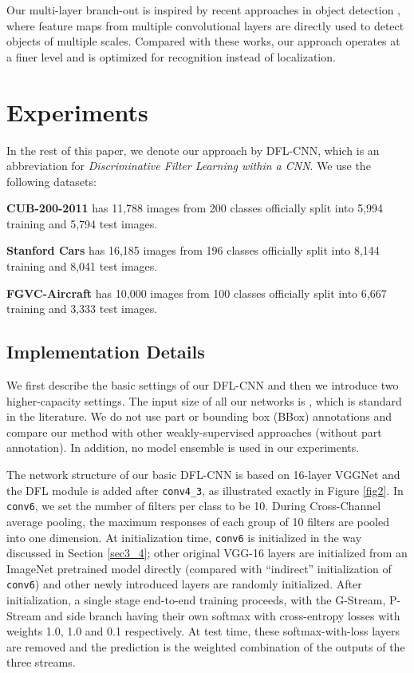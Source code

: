 \documentclass[10pt,twocolumn,letterpaper]{article}
\begin{document}
Our multi-layer branch-out is inspired by recent approaches in object detection \cite{ssd,
fanyang16}, where feature maps from multiple convolutional layers are directly used to detect objects of 
multiple scales. Compared with these works, our approach operates at a finer level
and is optimized for recognition instead of localization.

\section{Experiments} \label{sec4}
In the rest of this paper, we denote our approach by DFL-CNN, which is an abbreviation for \textit{Discriminative Filter Learning within a
CNN}. We use the following datasets: 

\noindent\textbf{CUB-200-2011} \cite{cub2011} has 11,788 images from 200 classes officially split into 5,994
training and 5,794 test images. 

\noindent\textbf{Stanford Cars} \cite{car196} has 16,185 images from 196 classes officially split into 8,144
training and 8,041 test images.

\noindent\textbf{FGVC-Aircraft} \cite{fgvc_air} has 10,000 images from 100 classes officially split into
 6,667 training and 3,333 test images.
\subsection{Implementation Details} \label{sec4_2}
We first describe the basic settings of our DFL-CNN and then we introduce two higher-capacity
settings. The input size of all our networks is , which is standard in the literature. We do not use part
or bounding box (BBox) annotations and compare our method with other weakly-supervised approaches (without part
annotation). In addition, no model ensemble is used in our experiments.

The network structure of our basic DFL-CNN is based on 16-layer VGGNet \cite{vgg} and the DFL module is added after
\texttt{conv4\_3}, as illustrated exactly in Figure \ref{fig2}.
In \texttt{conv6}, we set the number of filters per class to be 10. During Cross-Channel average
pooling, the maximum responses of each group of 10 filters are pooled into one dimension. At initialization time,
\texttt{conv6} is initialized in the way discussed in Section \ref{sec3_4}; other original VGG-16 layers are initialized
from an ImageNet pretrained model directly (compared with ``indirect'' initialization of \texttt{conv6}) and other newly
introduced layers are randomly initialized. After initialization, a single stage end-to-end training proceeds, with the
G-Stream, P-Stream and side branch having their own softmax with cross-entropy losses with 
weights 1.0, 1.0 and 0.1 respectively. At test time, these softmax-with-loss layers are removed and the prediction is
the weighted combination of the outputs of the three streams.
\end{document}
